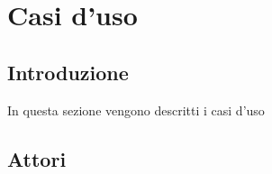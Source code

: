 \section{Casi d'uso}
    \subsection{Introduzione}
    In questa sezione vengono descritti i casi d'uso 
    \subsection{Attori}
    
    
    
    
    
    
    
    
    
    
